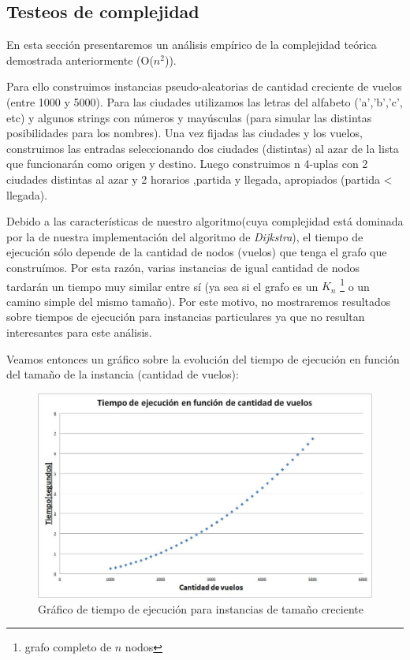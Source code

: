 \documentclass[11pt, a4paper, twoside]{article}
\begin{document}
\subsection{Testeos de complejidad}
En esta sección presentaremos un análisis empírico de la complejidad teórica demostrada anteriormente (O($n^2$)). 

Para ello construimos instancias pseudo-aleatorias de cantidad creciente de vuelos (entre 1000 y 5000). Para las ciudades utilizamos las letras del alfabeto ('a','b','c', etc) y algunos strings con números y mayúsculas (para simular las distintas posibilidades para los nombres). Una vez fijadas las ciudades y los vuelos, construimos las entradas seleccionando dos ciudades (distintas) al azar de la lista que funcionarán como origen y destino. Luego construimos n 4-uplas con 2 ciudades distintas al azar y 2 horarios ,partida y llegada, apropiados (partida < llegada).

Debido a las características de nuestro algoritmo(cuya complejidad está dominada por la de nuestra implementación del algoritmo de \textit{Dijkstra}), el tiempo de ejecución sólo depende de la cantidad de nodos (vuelos) que tenga el grafo que construímos. Por esta razón, varias instancias de igual cantidad de nodos tardarán un tiempo muy similar entre sí (ya sea si el grafo es un $K_n$ \footnote{grafo completo de $n$ nodos} o un camino simple del mismo tamaño). Por este motivo, no mostraremos resultados sobre tiempos de ejecución para instancias particulares ya que no resultan interesantes para este análisis.

Veamos entonces un gráfico sobre la evolución del tiempo de ejecución en función del tamaño de la instancia (cantidad de vuelos):

\begin{figure}[H]
\centering
\includegraphics[scale=0.5]{imagenes/graph2-1.jpg}
\caption{Gráfico de tiempo de ejecución para instancias de tamaño creciente}
\end{figure}
\end{document}
